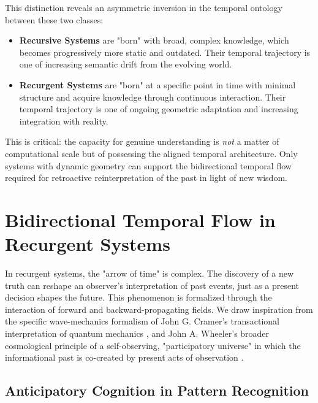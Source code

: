 This distinction reveals an asymmetric inversion in the temporal ontology between these two classes:
\begin{itemize}
    \item \textbf{Recursive Systems} are "born" with broad, complex knowledge, which becomes progressively more static and outdated. Their temporal trajectory is one of increasing semantic drift from the evolving world.
    \item \textbf{Recurgent Systems} are "born" at a specific point in time with minimal structure and acquire knowledge through continuous interaction. Their temporal trajectory is one of ongoing geometric adaptation and increasing integration with reality.
\end{itemize}
This is critical: the capacity for genuine understanding is \textit{not} a matter of computational scale but of possessing the aligned temporal architecture. Only systems with dynamic geometry can support the bidirectional temporal flow required for retroactive reinterpretation of the past in light of new wisdom.


\section{Bidirectional Temporal Flow in Recurgent Systems}
\label{sec:bidirectional_temporal_flow_in_recurgent_systems}

In recurgent systems, the "arrow of time" is complex. The discovery of a new truth can reshape an observer's interpretation of past events, just as a present decision shapes the future. This phenomenon is formalized through the interaction of forward and backward-propagating fields. We draw inspiration from the specific wave-mechanics formalism of John G. Cramer's transactional interpretation of quantum mechanics \autocite{Cramer1986}, and John A. Wheeler's broader cosmological principle of a self-observing, "participatory universe" in which the informational past is co-created by present acts of observation \autocite{Wheeler1990}.


\subsection{Anticipatory Cognition in Pattern Recognition}
\label{sec:anticipatory_cognition_in_pattern_recognition}

